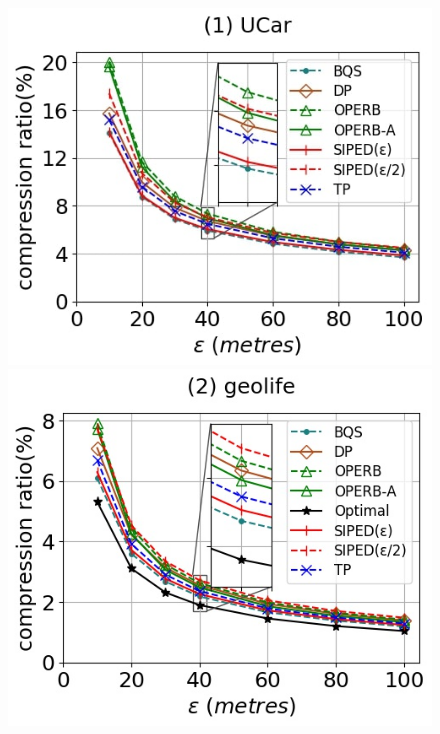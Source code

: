 \begin{figure}[tb!]
	\centering
	\includegraphics[scale=0.250]{Figures/Exp-PED-CR-epsilon-service.jpg} 	\hspace{0.5ex}
	\includegraphics[scale=0.348]{Figures/Exp-PED-CR-epsilon-geolife.jpg}	\hspace{0.5ex}

\end{figure}
